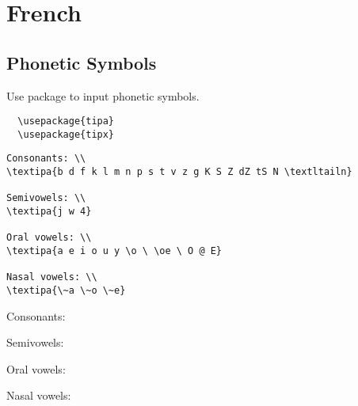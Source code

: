 
\chapter{French}


\section{Phonetic Symbols}
Use  package to input phonetic symbols.
\lstset{language=TeX}
\begin{lstlisting}
  \usepackage{tipa}
  \usepackage{tipx}
\end{lstlisting}

\begin{lstlisting}
Consonants: \\
\textipa{b d f k l m n p s t v z g K S Z dZ tS N \textltailn} 

Semivowels: \\
\textipa{j w 4}

Oral vowels: \\
\textipa{a e i o u y \o \ \oe \ O @ E}

Nasal vowels: \\
\textipa{\~a \~o \~e}
\end{lstlisting}


\begin{tcolorbox}
  Consonants: \\

Semivowels: \\

Oral vowels: \\

Nasal vowels: \\
\end{tcolorbox}